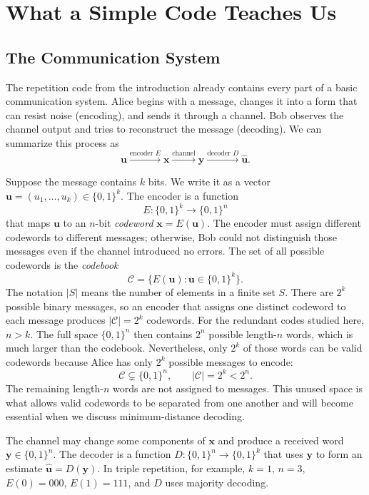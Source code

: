 \section{What a Simple Code Teaches Us}

\subsection{The Communication System}

The repetition code from the introduction already contains every part of a basic communication system. Alice begins with a message, changes it into a form that can resist noise (encoding), and sends it through a channel. Bob observes the channel output and tries to reconstruct the message (decoding). We can summarize this process as
\[
\mathbf{u}
\xrightarrow{\text{encoder }E}
\mathbf{x}
\xrightarrow{\text{channel}}
\mathbf{y}
\xrightarrow{\text{decoder }D}
\hat{\mathbf{u}}.
\]

Suppose the message contains $k$ bits. We write it as a vector $\mathbf{u}=(u_1,\ldots,u_k)\in\{0,1\}^k$. The encoder is a function
\[
E:\{0,1\}^k\longrightarrow\{0,1\}^n
\]
that maps $\mathbf{u}$ to an $n$-bit \emph{codeword} $\mathbf{x}=E(\mathbf{u})$. The encoder must assign different codewords to different messages; otherwise, Bob could not distinguish those messages even if the channel introduced no errors. The set of all possible codewords is the \emph{codebook}
\[
\mathcal{C}=\{E(\mathbf{u}):\mathbf{u}\in\{0,1\}^k\}.
\]
The notation $|S|$ means the number of elements in a finite set $S$. There are $2^k$ possible binary messages, so an encoder that assigns one distinct codeword to each message produces $|\mathcal{C}|=2^k$ codewords. For the redundant codes studied here, $n>k$. The full space $\{0,1\}^n$ then contains $2^n$ possible length-$n$ words, which is much larger than the codebook. Nevertheless, only $2^k$ of those words can be valid codewords because Alice has only $2^k$ possible messages to encode:
\[
\mathcal{C}\subsetneq\{0,1\}^n,
\qquad
|\mathcal{C}|=2^k<2^n.
\]
The remaining length-$n$ words are not assigned to messages. This unused space is what allows valid codewords to be separated from one another and will become essential when we discuss minimum-distance decoding.

The channel may change some components of $\mathbf{x}$ and produce a received word $\mathbf{y}\in\{0,1\}^n$. The decoder is a function $D:\{0,1\}^n\to\{0,1\}^k$ that uses $\mathbf{y}$ to form an estimate $\hat{\mathbf{u}}=D(\mathbf{y})$. In triple repetition, for example, $k=1$, $n=3$, $E(0)=000$, $E(1)=111$, and $D$ uses majority decoding.


